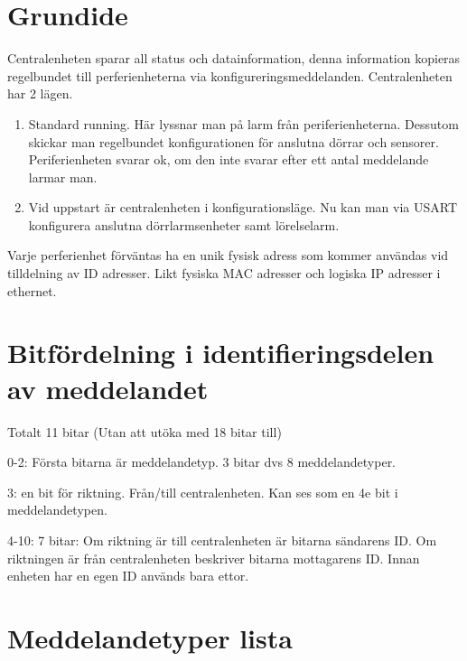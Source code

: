 \documentclass[a4paper]{article}
\begin{document}

\section*{Grundide}
\label{sec:grundide}

Centralenheten sparar all status och datainformation, denna information kopieras regelbundet till perferienheterna via konfigureringsmeddelanden. Centralenheten har 2 lägen.

\begin{enumerate}
	\item Standard running. Här lyssnar man på larm från periferienheterna. Dessutom skickar man regelbundet  konfigurationen för anslutna dörrar och sensorer. Periferienheten svarar ok, om den inte svarar efter ett antal meddelande larmar man.
	\item Vid uppstart är centralenheten i konfigurationsläge. Nu kan man via USART konfigurera anslutna dörrlarmsenheter samt lörelselarm.
\end{enumerate}

Varje perferienhet förväntas ha en unik fysisk adress som kommer användas vid tilldelning av ID adresser. Likt fysiska MAC adresser och logiska IP adresser i ethernet.

\section*{Bitfördelning i identifieringsdelen av meddelandet}
\label{sec:bitfördelning}

Totalt 11 bitar (Utan att utöka med 18 bitar till)
\begin{description}
	\item{0-2:} Första bitarna är meddelandetyp. 3 bitar dvs 8 meddelandetyper.
	\item{3:} en bit för riktning. Från/till centralenheten. Kan ses som en 4e bit i meddelandetypen.
	\item{4-10:} 7 bitar:
		Om riktning är till centralenheten är bitarna sändarens ID.
		Om riktningen är från centralenheten beskriver bitarna mottagarens ID.
		Innan enheten har en egen ID används bara ettor.
\end{description}


\section*{Meddelandetyper lista}
\label{sec:meddelandetyper}
\end{document}
